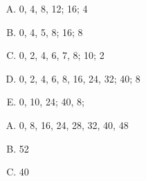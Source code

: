 {{        %
        \begin{practicec}
            \begin{enumerate}[A.]
                \item 0, 4, 8, 12; 16; 4
                \item 0, 4, 5, 8; 16; 8
                \item 0, 2, 4, 6, 7, 8; 10; 2
                \item 0, 2, 4, 6, 8, 16, 24, 32; 40; 8
                \item 0, 10, 24; 40, 8;
            \end{enumerate}
        \end{practicec}

        \begin{practicec}
            \begin{enumerate}[A.]
                \item 0, 8, 16, 24, 28, 32, 40, 48
                \item 52
                \item 40
            \end{enumerate}
        \end{practicec}
    }
}
